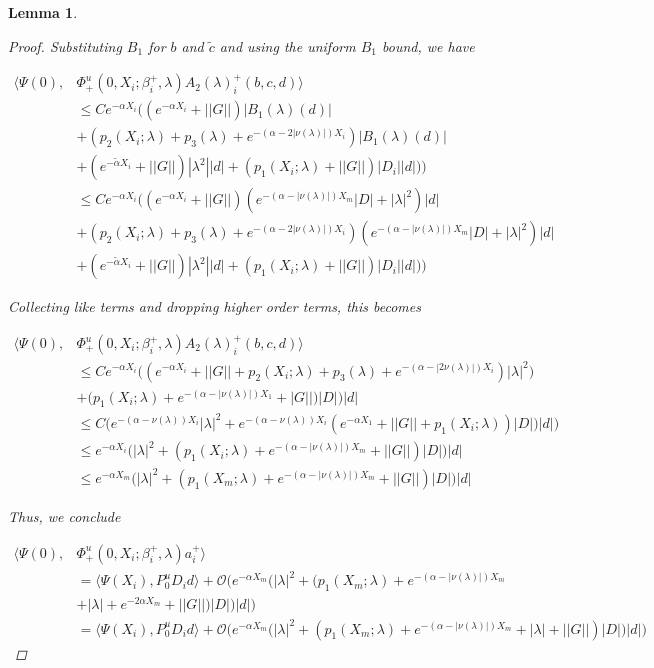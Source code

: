 \documentclass[12pt]{article}
\newtheorem{lemma}{Lemma}
\begin{document}
\begin{lemma}
\begin{proof}
Substituting $B_1$ for $b$ and $\tilde{c}$ and using the uniform $B_1$ bound, we have

\begin{align*}
\langle \Psi(0), &\Phi^u_+(0, X_i; \beta_i^+, \lambda) A_2(\lambda)_i^+(b,c,d) \rangle \\
&\leq C e^{-\alpha X_i}  \Big( (e^{-\alpha X_i} + ||G||)|B_1(\lambda)(d)| \\
&+ ( p_2(X_i; \lambda) + p_3(\lambda) + e^{-(\alpha - 2|\nu(\lambda)|)X_i} )|B_1(\lambda)(d)| \\
&+ (e^{-\tilde{\alpha} X_i} + ||G||) |\lambda^2| |d| +(p_1(X_i; \lambda) + ||G|| )|D_i||d|) \Big) \\
&\leq C e^{-\alpha X_i}  \Big( (e^{-\alpha X_i} + ||G||)( e^{-(\alpha - |\nu(\lambda)|) X_m} |D| + |\lambda|^2 )|d| \\
&+ ( p_2(X_i; \lambda) + p_3(\lambda) + e^{-(\alpha - 2|\nu(\lambda)|)X_i} )( e^{-(\alpha - |\nu(\lambda)|) X_m} |D| + |\lambda|^2 )|d| \\
&+ (e^{-\tilde{\alpha} X_i} + ||G||) |\lambda^2| |d| +(p_1(X_i; \lambda) + ||G|| )|D_i||d|) \Big) 
\end{align*}

Collecting like terms and dropping higher order terms, this becomes

\begin{align*}
\langle \Psi(0), &\Phi^u_+(0, X_i; \beta_i^+, \lambda) A_2(\lambda)_i^+(b,c,d) \rangle \\
&\leq C e^{-\alpha X_i} \Big( (e^{-\alpha X_i} + ||G|| + p_2(X_i; \lambda) + p_3(\lambda) + e^{-(\alpha - |2 \nu(\lambda)|)X_i} ) |\lambda|^2 ) \\
&+ (p_1(X_i; \lambda) + e^{-(\alpha - |\nu(\lambda)|) X_1} + |G|| )|D| \Big)|d| \\
&\leq C \Big( e^{-(\alpha - \nu(\lambda)) X_i} |\lambda|^2 
+ e^{-(\alpha - \nu(\lambda)) X_i}( e^{-\alpha X_1} + ||G|| + p_1(X_i; \lambda))|D| )|d| \Big) \\
&\leq e^{-\alpha X_i} \Big( |\lambda|^2  + (p_1(X_i; \lambda) + e^{-(\alpha - |\nu(\lambda)|) X_m} + ||G|| )|D| \Big)|d| \\
&\leq e^{-\alpha X_m} \Big( |\lambda|^2  + (p_1(X_m; \lambda) + e^{-(\alpha - |\nu(\lambda)|) X_m} + ||G|| )|D| \Big)|d| 
\end{align*}

Thus, we conclude

\begin{align*}
\langle \Psi(0), &\Phi^u_+(0, X_i; \beta_i^+, \lambda) a_i^+ \rangle \\
&= \langle \Psi(X_i), P^u_0 D_i d \rangle + \mathcal{O}\Big(e^{-\alpha X_m} \Big( |\lambda|^2  + (p_1(X_m; \lambda) + e^{-(\alpha - |\nu(\lambda)|) X_m} \\
&+ |\lambda| + e^{-2 \alpha X_m} + ||G|| )|D| \Big)|d|  \Big) \\
&= \langle \Psi(X_i), P^u_0 D_i d \rangle + \mathcal{O}\Big(e^{-\alpha X_m} \Big( |\lambda|^2  + (p_1(X_m; \lambda) + e^{-(\alpha - |\nu(\lambda)|) X_m} + |\lambda| + ||G|| )|D| \Big)|d| \Big)
\end{align*}



\end{proof}
\end{lemma}
\end{document}
